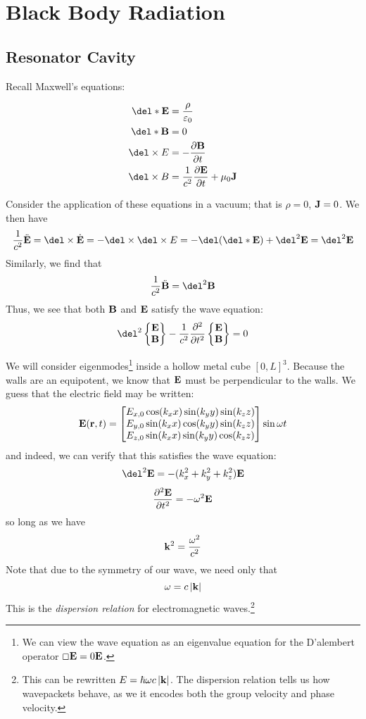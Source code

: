 \chapter{Black Body Radiation}
\section{Resonator Cavity}
Recall Maxwell's equations:
\begin{multicols}{2}
\begin{subequations}\noindent
	\begin{align}
		\del * \vb E & = \frac{\rho}{\varepsilon_0}\\
		\del* \vb B &= 0\\
		\del\times E&=-\pder{\vb B}{t}\\
		\del\times B&=\frac{1}{c^2}\pder{\vb E}{t}+\mu_0\vb J
	\end{align}
\end{subequations}
\end{multicols}
Consider the application of these equations in a vacuum; that is \(\rho = 0\), \(\mathbf{J} = 0\). We then have
\[\frac{1}{c^2}\ddot {\vb E} = \del\times\dot{\vb E} = -\del\times\del\times E=-\del(\del*\vb E)+\del^2\vb E = \del^2 \vb E\]
Similarly, we find that
\[\frac{1}{c^2}\ddot{\vb B} = \del^2 \vb B\]
Thus, we see that both \(\mathbf{B}\) and \(\mathbf{E}\) satisfy the wave equation:
\[\del^2 \left\{\begin{matrix}\vb E \\ \vb B\end{matrix}\right\} - \frac{1}{c^2}\pder{^2}{t^2}\left\{\begin{matrix}\vb E\\\vb B\end{matrix}\right\} = 0\]

We will consider eigenmodes\footnote{We can view the wave equation as an eigenvalue equation for the D'alembert operator \(\Box \mathbf{E} = 0\mathbf{E}\).} inside a hollow metal cube \([0,L]^3\). Because the walls are an equipotent, we know that \(\mathbf{E}\) must be perpendicular to the walls. We guess that the electric field may be written:
\begin{equation}
	\mathbf{E}(\mathbf{r}, t) = \begin{bmatrix}
		E_{x,0}\cos(k_x x)\sin(k_y y)\sin(k_z z)\\
		E_{y,0}\sin(k_x x)\cos(k_y y)\sin(k_z z)\\
		E_{z,0}\sin(k_x x)\sin(k_y y)\cos(k_z z)
	\end{bmatrix}\sin\omega t
\end{equation}
and indeed, we can verify that this satisfies the wave equation:
\[\del^2 \vb E = -(k_x^2+k_y^2+k_z^2)\vb E\]
\[\frac{\partial ^2\mathbf{E}}{\partial t^2} = -\omega^2\mathbf{E}\]
so long as we have
\[\mathbf{k}^2=\frac{\omega^2}{c^2}\]
Note that due to the symmetry of our wave, we need only that
\[\omega = c\left|\mathbf{k}\right|\]
This is the \emph{dispersion relation} for electromagnetic waves.\footnote{This can be rewritten \(E = \hbar\omega c \left|\mathbf{k}\right|\). The dispersion relation tells us how wavepackets behave, as we it encodes both the group velocity and phase velocity.}

